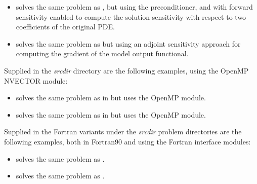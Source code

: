 \begin{itemize}
\item {}
  solves the same problem as , but using the {\idabbdpre}
  preconditioner, and with forward sensitivity enabled to compute the solution
  sensitivity with respect to two coefficients of the original PDE.
  

\item {}
  solves the same problem as  but using an adjoint
  sensitivity approach for computing the gradient of the model output functional.

\end{itemize}


\vspace{0.2in}\noindent 
Supplied in the {\em srcdir} directory are
the following examples, using the OpenMP NVECTOR module:

\begin{itemize}

\item {} solves the same problem as in
 but uses the OpenMP module. 

\item {} solves the same problem as in
 but uses the OpenMP module.

\end{itemize}


\vspace{0.2in}\noindent Supplied in the
Fortran variants under the {\em srcdir} problem directories are the
following examples, both in Fortran90 and using the {\sundials} Fortran
interface modules:

\begin{itemize}

\item {} solves the same problem as .

\item {} solves the same problem as
  .

\end{itemize}

